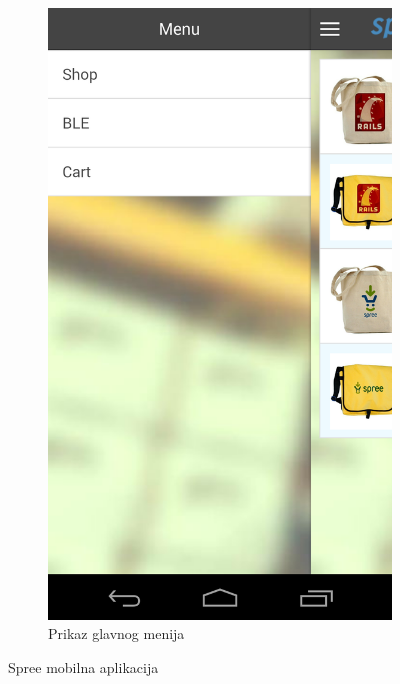 \begin{figure}[H]
\begin{subfigure}[b]{0.45\textwidth}
        \includegraphics[scale=0.15]{pictures/spreeMobile2}
        \caption{Prikaz glavnog menija}
        \label{fig:spreeMobile2}
    \end{subfigure}
    
    \caption{Spree mobilna aplikacija}
\end{figure}